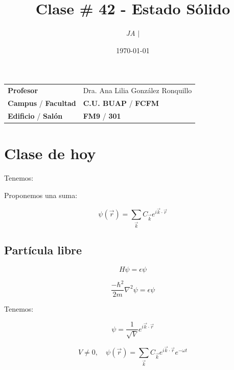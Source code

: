 \documentclass{article}
\title{Clase \# 42 - Estado Sólido}
\author{\emph{JA} $\boldsymbol{\mid}$}
\date{\today}
\begin{document}
\maketitle



\begin{mybox}
\noindent\begin{tabular}{@{}ll}
	{\bfseries{Profesor}} & Dra. Ana Lilia González Ronquillo\\
	\textcolor{prussianblue}{\bfseries{Campus}} / \textcolor{trueblue}{\bfseries{Facultad}}  & \textcolor{prussianblue}{\bfseries{C.U. BUAP}} /  \textcolor{trueblue}{\bfseries{FCFM}} \\
	\textcolor{prussianblue}{\bfseries{Edificio}} /  \textcolor{trueblue}{\bfseries{Salón}}    & 	\textcolor{prussianblue}{\bfseries{FM9}} /  \textcolor{trueblue}{\bfseries{301}}   
\end{tabular} 
\end{mybox} \vspace{1cm}

\tableofcontents

\vspace{2cm}


\section{Clase de hoy}


Tenemos:



Proponemos una suma:


\[ \psi(\vec{r}) = \sum\limits_{\vec{k}} C_{\vec{k}} e^{i\vec{k} \cdot \vec{r}} \]




\subsection{Partícula libre}



\[ H\psi = \epsilon \psi \]

\[  \frac{- \hbar^{2}}{  2m } \nabla^{2} \psi = \epsilon \psi  \]



Tenemos:


\[ \psi = \frac{1}{ \sqrt{V} } e^{i \vec{k} \cdot \vec{r}} \]


\[ V \neq 0, \quad \psi(\vec{r}) = \sum\limits_{\vec{k}} C_{\vec{k}}  e^{i\vec{k}\cdot \vec{r}} e^{- \omega t} \]
\end{document}

